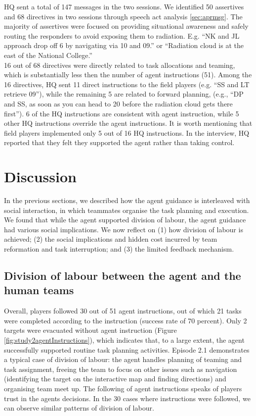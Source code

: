 HQ sent a total of 147 messages in the two sessions. We identified 50 assertives and 68 directives in two sessions through speech act analysis \ref{sec:aprmsg}. The majority of assertives were focused on providing situational awareness and safely routing the responders to avoid exposing them to radiation. E.g. ``NK and JL approach drop off 6 by navigating via 10 and 09.'' or ``Radiation cloud is at the east of the National College.''\\

16 out of 68 directives were directly related to task allocations and teaming, which is substantially less then the number of agent instructions (51). Among the 16 directives, HQ sent 11 direct instructions to the field players (e.g. ``SS and LT retrieve 09''), while the remaining 5 are related to forward planning, (e.g., ``DP and SS, as soon as you can head to 20 before the radiation cloud gets there first''). 6 of the HQ instructions are consistent with agent instruction, while 5 other HQ instructions override the agent instructions. It is worth mentioning that field players implemented only 5 out of 16 HQ instructions. In the interview, HQ reported that they felt they supported the agent rather than taking control. \\


\section{Discussion}
In the previous sections, we described how the agent guidance is interleaved with social interaction, in which teammates organise the task planning and execution. We found that while the agent supported division of labour, the agent guidance had various social implications. We now reflect on (1) how division of labour is achieved; (2) the social implications and hidden cost incurred by team reformation and task interruption; and (3) the limited feedback mechanism. \\

\subsection{Division of labour between the agent and the human teams}
Overall, players followed 30 out of 51 agent instructions, out of which 21 tasks were completed according to the instruction (success rate of 70 percent). Only 2 targets were evacuated without agent instruction (Figure \ref{fig:study2agentInstructions}), which indicates that, to a large extent, the agent successfully supported routine task planning activities. Episode 2.1 demonstrates a typical case of division of labour: the agent handles planning of teaming and task assignment, freeing the team to focus on other issues such as navigation (identifying the target on the interactive map and finding directions) and organising team meet up.  The following of agent instructions speaks of players trust in the agents decisions. In the 30 cases where instructions were followed, we can observe similar patterns of division of labour.\\


